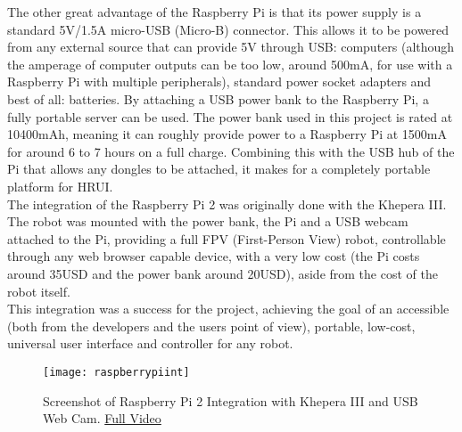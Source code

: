 The other great advantage of the Raspberry Pi is that its power supply is a standard 5V/1.5A micro-USB (Micro-B) connector. This allows 
it to be powered from any external source that can provide 5V through USB: computers (although the amperage of computer outputs can be 
too low, around 500mA, for use with a Raspberry Pi with multiple peripherals), standard power socket adapters and best of all: 
batteries. By attaching a USB power bank to the Raspberry Pi, a fully portable server can be used. The power bank used in this project 
is rated at 10400mAh, meaning it can roughly provide power to a Raspberry Pi at 1500mA for around 6 to 7 hours on a full charge. 
Combining this with the USB hub of the Pi that allows any dongles to be attached, it makes for a completely portable platform for HRUI.\\

The integration of the Raspberry Pi 2 was originally done with the Khepera III. The robot was mounted with the power bank, the Pi and a 
USB webcam attached to the Pi, providing a full FPV (First-Person View) robot, controllable through any web browser capable device, with 
a very low cost (the Pi costs around 35USD and the power bank around 20USD), aside from the cost of the robot itself.\\

This integration was a success for the project, achieving the goal of an accessible (both from the developers and the users point of
view), portable, low-cost, universal user interface and controller for any robot.
\begin{figure}[H]
\centering
\captionsetup{justification=centering}
\texttt{[image: raspberrypiint]}
\caption{Screenshot of Raspberry Pi 2 Integration with Khepera III and USB Web Cam. 
\href{https://www.youtube.com/watch?v=HtgBNOEmj6w}{Full Video}}
\end{figure}